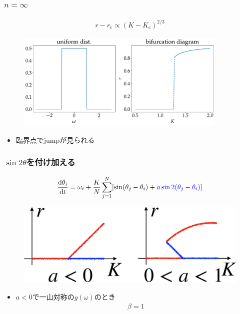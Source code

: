 \begin{frame}\frametitle{$n=\infty$}
  \begin{align*}
    r-r_{\mathrm{c}}\propto(K-K_{\mathrm{c}})^{2/3}
  \end{align*}
  \begin{figure}
    \begin{center}
      \includegraphics[width=0.9\textwidth]{figs/uniform_branch.pdf}
    \end{center}
  \end{figure}
  \begin{itemize}
    \item 臨界点でjumpが見られる
  \end{itemize}
\end{frame}
%
\begin{frame}\frametitle{$\sin2\theta$を付け加える}
  \begin{align*}
    \frac{\mathrm{d}\theta_{i}}{\mathrm{d} t}=\omega_{i}+\frac{K}{N}\sum_{j=1}^{N}[\sin(\theta_{j}-\theta_{i})+\textcolor{blue}{a\sin2(\theta_{j}-\theta_{i})}]
    \end{align*}
    \begin{figure}
    \includegraphics[scale=0.3]{figs/sin2-crop.pdf}
    \end{figure}
  \begin{itemize}
    \item $a<0$で一山対称の$g(\omega)$のとき
    \begin{align*}
      \beta=1
    \end{align*}
  \end{itemize}
\end{frame}

